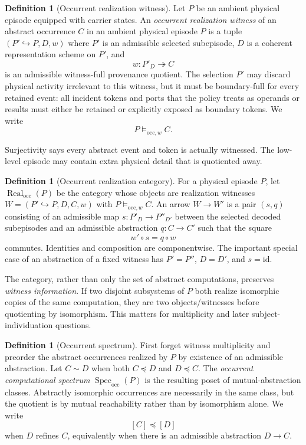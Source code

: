 \documentclass[11pt,a4paper]{article}
\theoremstyle{clean}
\theoremstyle{definition}
\newtheorem{definition}[theorem]{Definition}
\newcommand{\Spec}{\operatorname{Spec}}
\newcommand{\Real}{\operatorname{Real}}
\newcommand{\Occ}{\mathrm{occ}}
\begin{document}
\begin{definition}[Occurrent realization witness]
Let $P$ be an ambient physical episode equipped with carrier states. An \emph{occurrent realization witness} of an abstract occurrence $C$ in an ambient physical episode $P$ is a tuple $(P'\hookrightarrow P,D,w)$ where $P'$ is an admissible selected subepisode, $D$ is a coherent representation scheme on $P'$, and
\[
w:P'_D\twoheadrightarrow C
\]
is an admissible witness-full provenance quotient. The selection $P'$ may discard physical activity irrelevant to this witness, but it must be boundary-full for every retained event: all incident tokens and ports that the policy treats as operands or results must either be retained or explicitly exposed as boundary tokens. We write
\[
P\models_{\Occ,w} C.
\]
\end{definition}

Surjectivity says every abstract event and token is actually witnessed. The low-level episode may contain extra physical detail that is quotiented away.

\begin{definition}[Occurrent realization category]
For a physical episode $P$, let $\Real_\Occ(P)$ be the category whose objects are realization witnesses $W=(P'\hookrightarrow P,D,C,w)$ with $P\models_{\Occ,w} C$. An arrow $W\to W'$ is a pair $(s,q)$ consisting of an admissible map $s:P'_D\to P''_{D'}$ between the selected decoded subepisodes and an admissible abstraction $q:C\to C'$ such that the square
\[
w'\circ s=q\circ w
\]
commutes. Identities and composition are componentwise. The important special case of an abstraction of a fixed witness has $P'=P''$, $D=D'$, and $s=\mathrm{id}$.
\end{definition}

\begin{intuitionbox}
The category, rather than only the set of abstract computations, preserves \emph{witness information}. If two disjoint subsystems of $P$ both realize isomorphic copies of the same computation, they are two objects/witnesses before quotienting by isomorphism. This matters for multiplicity and later subject-individuation questions.
\end{intuitionbox}

\begin{definition}[Occurrent spectrum]
First forget witness multiplicity and preorder the abstract occurrences realized by $P$ by existence of an admissible abstraction. Let $C\sim D$ when both $C\preceq D$ and $D\preceq C$. The \emph{occurrent computational spectrum} $\Spec_\Occ(P)$ is the resulting poset of mutual-abstraction classes. Abstractly isomorphic occurrences are necessarily in the same class, but the quotient is by mutual reachability rather than by isomorphism alone. We write
\[
[C]\preceq[D]
\]
when $D$ refines $C$, equivalently when there is an admissible abstraction $D\to C$.
\end{definition}
\end{document}
